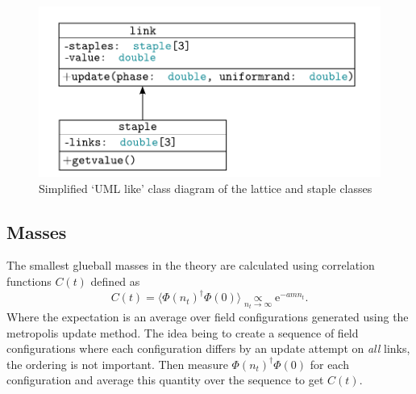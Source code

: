 \documentclass[12pt]{article}
\begin{document}
\begin{figure}
\centering
\includegraphics[width=0.7\linewidth]{latticeclass.pdf}
\caption{\label{fig:latticeclass} Simplified `UML like' class diagram of the lattice and staple classes}
\end{figure}

\subsection{Masses}
The smallest glueball masses in the theory are calculated using correlation functions $C(t)$ defined as
\begin{equation}
    C(t) = \langle \Phi(n_t)^{\dagger}\Phi(0) \rangle \underset{n_t\rightarrow \infty}{\propto} \mathrm{e}^{-amn_t}.
\end{equation}
Where the expectation is an average over field configurations generated using the metropolis update method. The idea being to create a sequence of field configurations where each configuration differs by an update attempt on \emph{all} links, the ordering is not important. Then measure $\Phi(n_t)^{\dagger}\Phi(0)$ for each configuration and average this quantity over the sequence to get $C(t)$.
\end{document}
